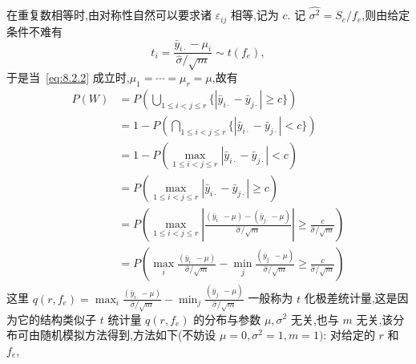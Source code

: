 在重复数相等时,由对称性自然可以要求诸 $\varepsilon_{ij}$ 相等,记为 $c$. 记 $\hat{\sigma^2} = S_e/f_e$,则由给定条件不难有
\begin{equation*}
  t_i = \frac{\bar{y}_{i\cdot} - \mu_i}{\hat{\sigma}/\sqrt{m}} \sim t(f_e),
\end{equation*}
于是当~\eqref{eq:8.2.2} 成立时,$\mu_1 = \cdots = \mu_r = \mu$,故有
\begin{align*}
  P(W)  & = P\left(\bigcup_{1\leq i < j \leq r} \{|\bar{y}_{i\cdot} - \bar{y}_{j\cdot}| \geq c\}\right)\\
        & = 1- P\left(\bigcap_{1\leq i < j \leq r} \{|\bar{y}_{i\cdot} - \bar{y}_{j\cdot}| < c\}\right)\\
        & = 1 - P(\max_{1\leq i < j \leq r} |\bar{y}_{i\cdot} - \bar{y}_{j\cdot}| < c) \\
        & = P(\max_{1\leq i < j \leq r} |\bar{y}_{i\cdot} - \bar{y}_{j\cdot}| \geq c) \\
        & = P\left(\max_{1 \leq i < j \leq r} \left|\frac{(\bar{y}_{i\cdot}-\mu) - (\bar{y}_{j\cdot}-\mu)}{\hat{\sigma}/\sqrt{m}}\right|\geq \frac{c}{\hat{\sigma}/\sqrt{m}}\right)\\
        & = P\left(\max_{i} \frac{(\bar{y}_{i\cdot}-\mu)}{\hat{\sigma}/\sqrt{m}} - \min_{j}\frac{(\bar{y}_{j\cdot}-\mu)}{\hat{\sigma}/\sqrt{m}}\geq \frac{c}{\hat{\sigma}/\sqrt{m}}\right)
\end{align*}
这里 $q(r,f_e)=\max_{i} \frac{(\bar{y}_{i\cdot}-\mu)}{\hat{\sigma}/\sqrt{m}} - \min_{j} \frac{(\bar{y}_{j\cdot}-\mu)}{\hat{\sigma}/\sqrt{m}}$ 一般称为 $t$ 化极差统计量,这是因为它的结构类似子 $t$ 统计量 $q(r,f_e)$ 的分布与参数 $\mu, \sigma^2$ 无关,也与 $m$ 无关,该分布可由随机模拟方法得到,方法如下(不妨设 $\mu=0, \sigma^2=1, m=1)$: 对给定的 $r$ 和 $f_e$,
